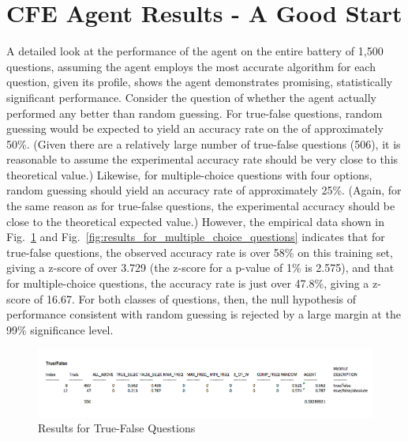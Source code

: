 \section{CFE Agent Results - A Good Start}

A detailed look at the performance of the agent on the entire battery of 1,500 questions, assuming the agent employs the most accurate algorithm for each question, given its profile, shows the agent demonstrates promising, statistically significant performance.  Consider the question of whether the agent actually performed any better than random guessing.  For true-false questions, random guessing would be expected to yield an accuracy rate on the of approximately 50\%.  (Given there are a relatively large number of true-false questions (506), it is reasonable to assume the experimental accuracy rate should be very close to this theoretical value.)  Likewise, for multiple-choice questions with four options, random guessing should yield an accuracy rate of approximately 25\%.  (Again, for the same reason as for true-false questions, the experimental accuracy should be close to the theoretical expected value.)  However, the empirical data shown in Fig.~\ref{fig:results_for_true_false_questions} and Fig.~\ref{fig:results_for_multiple_choice_questions} indicates that for true-false questions, the observed accuracy rate is over 58\% on this training set, giving a z-score of over 3.729 (the z-score for a p-value of 1\% is 2.575), and that for multiple-choice questions, the accuracy rate is just over 47.8\%, giving a z-score of 16.67.  For both classes of questions, then, the null hypothesis of performance consistent with random guessing is rejected by a large margin at the 99\% significance level.  


\begin{figure}
\centering
\includegraphics[width=130mm]{true_false_results_1500.png}
\caption{Results for True-False Questions}
\label{fig:results_for_true_false_questions}
\end{figure}

